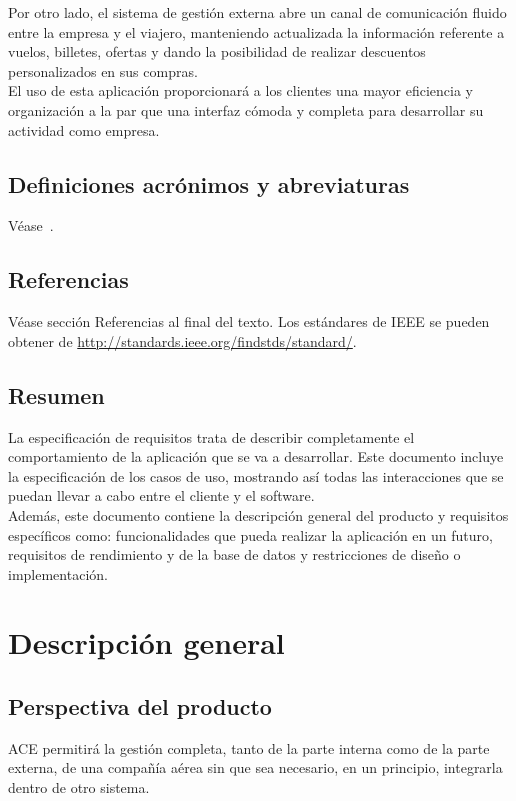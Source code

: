 \documentclass[11pt, a4paper, twoside, titlepage]{article}
\begin{document}
			Por otro lado, el sistema de gestión externa abre un canal de comunicación fluido entre la empresa y el viajero, manteniendo actualizada la información referente a vuelos, billetes, ofertas y dando la posibilidad de realizar descuentos personalizados en sus compras.\\

			El uso de esta aplicación proporcionará a los clientes una mayor eficiencia y organización a la par que una interfaz cómoda y completa para desarrollar su actividad como empresa. 
			
		\subsection{Definiciones acrónimos y abreviaturas}
			Véase~.
		\subsection{Referencias}
			Véase sección Referencias al final del texto. Los estándares de IEEE se pueden obtener de \url{http://standards.ieee.org/findstds/standard/}.
		\subsection{Resumen}
			La especificación de requisitos trata de describir completamente el comportamiento de la aplicación que se va a desarrollar. Este documento incluye la especificación de los casos de uso, mostrando así todas las interacciones que se puedan llevar a cabo entre el cliente y el software. \\

			Además, este documento contiene la descripción general del producto y requisitos específicos como: funcionalidades que pueda realizar la aplicación en un futuro, requisitos de rendimiento y de la base de datos y restricciones de diseño o implementación.
			
	\section{Descripción general}
		\subsection{Perspectiva del producto}
			ACE permitirá la gestión completa, tanto de la parte interna como de la parte externa, de una compañía aérea sin que sea necesario, en un principio, integrarla dentro de otro sistema. \\
			
\end{document}
